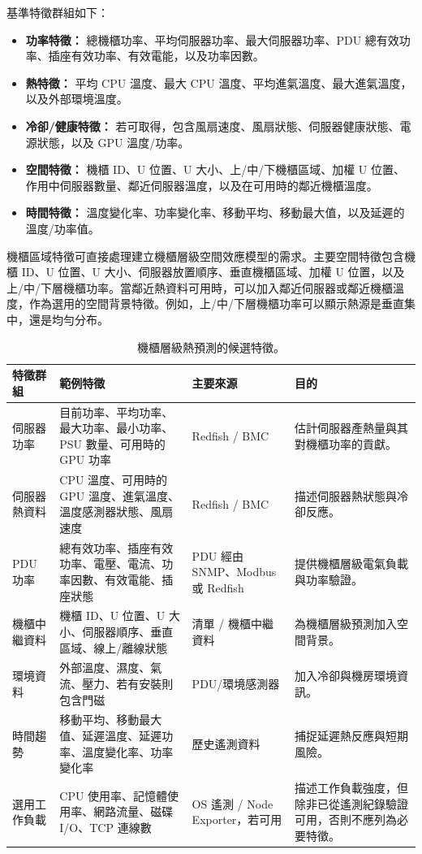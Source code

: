 \documentclass[12pt,a4paper]{article}
\begin{document}
基準特徵群組如下：
\begin{itemize}
\item \textbf{功率特徵：} 總機櫃功率、平均伺服器功率、最大伺服器功率、PDU 總有效功率、插座有效功率、有效電能，以及功率因數。
\item \textbf{熱特徵：} 平均 CPU 溫度、最大 CPU 溫度、平均進氣溫度、最大進氣溫度，以及外部環境溫度。
\item \textbf{冷卻/健康特徵：} 若可取得，包含風扇速度、風扇狀態、伺服器健康狀態、電源狀態，以及 GPU 溫度/功率。
\item \textbf{空間特徵：} 機櫃 ID、U 位置、U 大小、上/中/下機櫃區域、加權 U 位置、作用中伺服器數量、鄰近伺服器溫度，以及在可用時的鄰近機櫃溫度。
\item \textbf{時間特徵：} 溫度變化率、功率變化率、移動平均、移動最大值，以及延遲的溫度/功率值。
\end{itemize}

機櫃區域特徵可直接處理建立機櫃層級空間效應模型的需求。主要空間特徵包含機櫃 ID、U 位置、U 大小、伺服器放置順序、垂直機櫃區域、加權 U 位置，以及上/中/下層機櫃功率。當鄰近熱資料可用時，可以加入鄰近伺服器或鄰近機櫃溫度，作為選用的空間背景特徵。例如，上/中/下層機櫃功率可以顯示熱源是垂直集中，還是均勻分布。

\begin{table}[H]
\scriptsize
\centering
\caption{機櫃層級熱預測的候選特徵。}
\label{tab:candidate_features}
\footnotesize
\begin{tabularx}{\textwidth}{p{} p{} p{} Y}
\toprule
\textbf{特徵群組} & \textbf{範例特徵} & \textbf{主要來源} & \textbf{目的} \\
\midrule
伺服器功率 & 目前功率、平均功率、最大功率、最小功率、PSU 數量、可用時的 GPU 功率 & Redfish / BMC & 估計伺服器產熱量與其對機櫃功率的貢獻。 \\
\addlinespace
伺服器熱資料 & CPU 溫度、可用時的 GPU 溫度、進氣溫度、溫度感測器狀態、風扇速度 & Redfish / BMC & 描述伺服器熱狀態與冷卻反應。 \\
\addlinespace
PDU 功率 & 總有效功率、插座有效功率、電壓、電流、功率因數、有效電能、插座狀態 & PDU 經由 SNMP、Modbus 或 Redfish & 提供機櫃層級電氣負載與功率驗證。 \\
\addlinespace
機櫃中繼資料 & 機櫃 ID、U 位置、U 大小、伺服器順序、垂直區域、線上/離線狀態 & 清單 / 機櫃中繼資料 & 為機櫃層級預測加入空間背景。 \\
\addlinespace
環境資料 & 外部溫度、濕度、氣流、壓力、若有安裝則包含門磁 & PDU/環境感測器 & 加入冷卻與機房環境資訊。 \\
\addlinespace
時間趨勢 & 移動平均、移動最大值、延遲溫度、延遲功率、溫度變化率、功率變化率 & 歷史遙測資料 & 捕捉延遲熱反應與短期風險。 \\
\addlinespace
選用工作負載 & CPU 使用率、記憶體使用率、網路流量、磁碟 I/O、TCP 連線數 & OS 遙測 / Node Exporter，若可用 & 描述工作負載強度，但除非已從遙測紀錄驗證可用，否則不應列為必要特徵。 \\
\bottomrule
\end{tabularx}
\end{table}
\end{document}
